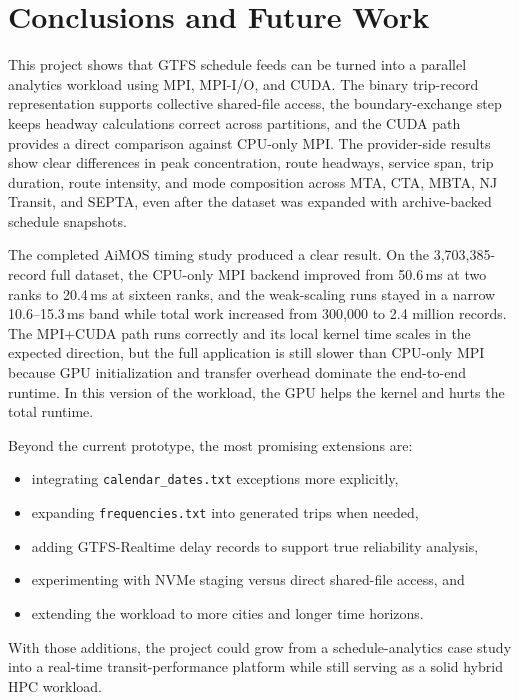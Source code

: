 \documentclass[sigconf,nonacm]{acmart}
\begin{document}
\section{Conclusions and Future Work}
This project shows that GTFS schedule feeds can be turned into a parallel analytics workload using MPI, MPI-I/O, and CUDA. The binary trip-record representation supports collective shared-file access, the boundary-exchange step keeps headway calculations correct across partitions, and the CUDA path provides a direct comparison against CPU-only MPI. The provider-side results show clear differences in peak concentration, route headways, service span, trip duration, route intensity, and mode composition across MTA, CTA, MBTA, NJ Transit, and SEPTA, even after the dataset was expanded with archive-backed schedule snapshots.

The completed AiMOS timing study produced a clear result. On the 3,703,385-record full dataset, the CPU-only MPI backend improved from 50.6\,ms at two ranks to 20.4\,ms at sixteen ranks, and the weak-scaling runs stayed in a narrow 10.6--15.3\,ms band while total work increased from 300,000 to 2.4 million records. The MPI+CUDA path runs correctly and its local kernel time scales in the expected direction, but the full application is still slower than CPU-only MPI because GPU initialization and transfer overhead dominate the end-to-end runtime. In this version of the workload, the GPU helps the kernel and hurts the total runtime.

Beyond the current prototype, the most promising extensions are:
\begin{itemize}[leftmargin=*]
  \item integrating \texttt{calendar\_dates.txt} exceptions more explicitly,
  \item expanding \texttt{frequencies.txt} into generated trips when needed,
  \item adding GTFS-Realtime delay records to support true reliability analysis,
  \item experimenting with NVMe staging versus direct shared-file access, and
  \item extending the workload to more cities and longer time horizons.
\end{itemize}

With those additions, the project could grow from a schedule-analytics case study into a real-time transit-performance platform while still serving as a solid hybrid HPC workload.



\end{document}
